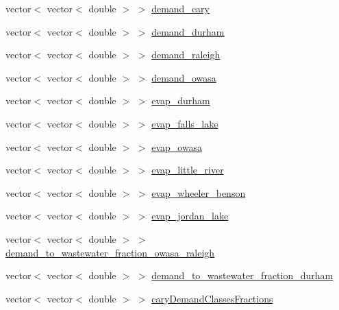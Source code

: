 \begin{DoxyCompactItemize}
\item 
vector$<$ vector$<$ double $>$ $>$ \mbox{\hyperlink{classTriangle_a64dfcb5c1225f772fdadee71f776bc6a_a64dfcb5c1225f772fdadee71f776bc6a}{demand\+\_\+cary}}
\item 
vector$<$ vector$<$ double $>$ $>$ \mbox{\hyperlink{classTriangle_a0e82969571c5cdb51e98fe4b74a89597_a0e82969571c5cdb51e98fe4b74a89597}{demand\+\_\+durham}}
\item 
vector$<$ vector$<$ double $>$ $>$ \mbox{\hyperlink{classTriangle_a94d23326283d34b4000ac9c1ab6e848f_a94d23326283d34b4000ac9c1ab6e848f}{demand\+\_\+raleigh}}
\item 
vector$<$ vector$<$ double $>$ $>$ \mbox{\hyperlink{classTriangle_a3a3e2438a3c125a53d08101dc0ba82ac_a3a3e2438a3c125a53d08101dc0ba82ac}{demand\+\_\+owasa}}
\item 
vector$<$ vector$<$ double $>$ $>$ \mbox{\hyperlink{classTriangle_a11dd71d21edee3cf466d30117e378fb9_a11dd71d21edee3cf466d30117e378fb9}{evap\+\_\+durham}}
\item 
vector$<$ vector$<$ double $>$ $>$ \mbox{\hyperlink{classTriangle_a4ad865bba9e2b65233aa453ea95d1950_a4ad865bba9e2b65233aa453ea95d1950}{evap\+\_\+falls\+\_\+lake}}
\item 
vector$<$ vector$<$ double $>$ $>$ \mbox{\hyperlink{classTriangle_a9b1fbfcfe6230372f486382bd3b47717_a9b1fbfcfe6230372f486382bd3b47717}{evap\+\_\+owasa}}
\item 
vector$<$ vector$<$ double $>$ $>$ \mbox{\hyperlink{classTriangle_a48c51eabed2ace852d31b1df2e98f8d4_a48c51eabed2ace852d31b1df2e98f8d4}{evap\+\_\+little\+\_\+river}}
\item 
vector$<$ vector$<$ double $>$ $>$ \mbox{\hyperlink{classTriangle_a03a6df04c98f4a9030de3da381155cd8_a03a6df04c98f4a9030de3da381155cd8}{evap\+\_\+wheeler\+\_\+benson}}
\item 
vector$<$ vector$<$ double $>$ $>$ \mbox{\hyperlink{classTriangle_aa340181943eedb577bf81215e34701f5_aa340181943eedb577bf81215e34701f5}{evap\+\_\+jordan\+\_\+lake}}
\item 
vector$<$ vector$<$ double $>$ $>$ \mbox{\hyperlink{classTriangle_ac1aeb61eae9f469b139c38d688235724_ac1aeb61eae9f469b139c38d688235724}{demand\+\_\+to\+\_\+wastewater\+\_\+fraction\+\_\+owasa\+\_\+raleigh}}
\item 
vector$<$ vector$<$ double $>$ $>$ \mbox{\hyperlink{classTriangle_a69d6615c9468c9637a2ce0ea52e23930_a69d6615c9468c9637a2ce0ea52e23930}{demand\+\_\+to\+\_\+wastewater\+\_\+fraction\+\_\+durham}}
\item 
vector$<$ vector$<$ double $>$ $>$ \mbox{\hyperlink{classTriangle_a7fdcf318d2bcf58cea83c451b59df74b_a7fdcf318d2bcf58cea83c451b59df74b}{cary\+Demand\+Classes\+Fractions}}

\end{DoxyCompactItemize}
